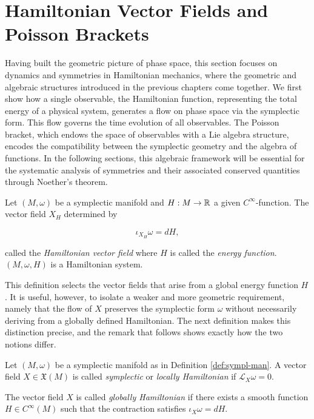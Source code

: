 \section{Hamiltonian Vector Fields and Poisson Brackets}\label{sec:1-ham}

Having built the geometric picture of phase space, this section focuses on dynamics and symmetries in Hamiltonian mechanics, where the geometric and algebraic structures introduced in the previous chapters come together. We first show how a single observable, the Hamiltonian function, representing the total energy of a physical system, generates a flow on phase space via the symplectic form. This flow governs the time evolution of all observables. The Poisson bracket, which endows the space of observables with a Lie algebra structure, encodes the compatibility between the symplectic geometry and the algebra of functions. In the following sections, this algebraic framework will be essential for the systematic analysis of symmetries and their associated conserved quantities through Noether's theorem.

\begin{definition}\label{def:ham-field}
	Let $(M, \omega)$ be a symplectic manifold and $H : M \to \mathbb{R}$ a given $C^\infty$-function. The vector field $X_H$ determined by 
	
	\begin{equation}
		\iota_{X_H}\omega=dH, \label{eq:hamiltonian}
	\end{equation}
	
	\noindent called the \emph{Hamiltonian vector field} where $H$ is called the \emph{energy function}. $(M, \omega, H)$ is a Hamiltonian system.
\end{definition}

This definition selects the vector fields that arise from a global energy function $H$. It is useful, however, to isolate a weaker and more geometric requirement, namely that the flow of $X$ preserves the symplectic form $\omega$ without necessarily deriving from a globally defined Hamiltonian. The next definition makes this distinction precise, and the remark that follows shows exactly how the two notions differ.

\begin{definition}\label{def:symp-ham-fields}
	Let $(M,\omega)$ be a symplectic manifold as in Definition \ref{def:sympl-man}. A vector field $X \in \mathfrak{X}(M)$ is called \emph{symplectic} or \emph{locally Hamiltonian} if $\mathscr{L}_X\omega = 0$. 
	
	The vector field $X$ is called \emph{globally Hamiltonian} if there exists a smooth function $H \in C^\infty(M)$ such that the contraction satisfies $\iota_X\omega = dH$.
\end{definition}

